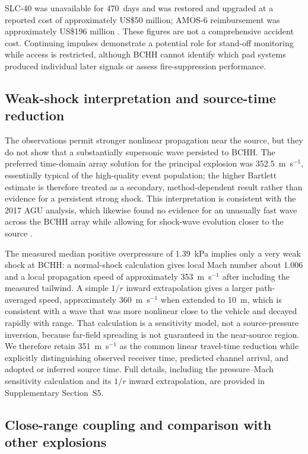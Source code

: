 \documentclass[]{seismica}
\begin{document}
SLC-40 was unavailable for 470~days and was restored and upgraded at a reported
cost of approximately US\$50 million; AMOS-6 reimbursement was approximately
US\$196 million \citep{clark_slc40_2017,magan_amos6_2016,
spacex_crs13_2017}. These figures are not a comprehensive accident cost.
Continuing impulses demonstrate a potential role for stand-off monitoring
while access is restricted, although BCHH cannot identify which pad systems
produced individual later signals or assess fire-suppression performance.

\subsection{Weak-shock interpretation and source-time reduction}

The observations permit stronger nonlinear propagation near the source, but
they do not show that a substantially supersonic wave persisted to BCHH. The
preferred time-domain array solution for the principal explosion was
352.5~m~s$^{-1}$, essentially typical of the high-quality event population;
the higher Bartlett estimate is therefore treated as a secondary,
method-dependent result rather than evidence for a persistent strong shock.
This interpretation is consistent with the 2017 AGU analysis, which likewise
found no evidence for an unusually fast wave across the BCHH array while
allowing for shock-wave evolution closer to the source
\citep{thompson_agu_falcon9_2017}.

The measured median positive overpressure of 1.39~kPa implies only a very weak
shock at BCHH: a normal-shock calculation gives local Mach number about 1.006
and a local propagation speed of approximately 353~m~s$^{-1}$ after including
the measured tailwind. A simple $1/r$ inward extrapolation gives a larger
path-averaged speed, approximately 360~m~s$^{-1}$ when extended to 10~m, which
is consistent with a wave that was more nonlinear close to the vehicle and
decayed rapidly with range. That calculation is a sensitivity model, not a
source-pressure inversion, because far-field spreading is not guaranteed in
the near-source region. We therefore retain 351~m~s$^{-1}$ as the common linear
travel-time reduction while explicitly distinguishing observed receiver time,
predicted channel arrival, and adopted or inferred source time. Full details,
including the pressure--Mach sensitivity calculation and its $1/r$ inward
extrapolation, are provided in Supplementary Section~S5.

\subsection{Close-range coupling and comparison with other explosions}
\end{document}
